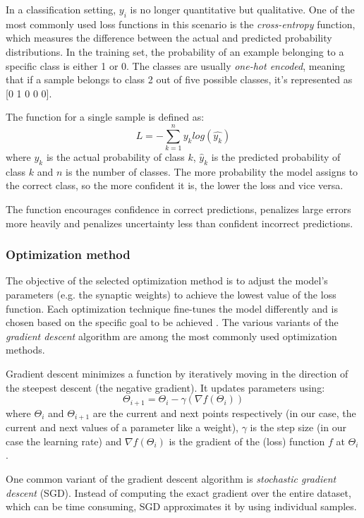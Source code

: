 \documentclass[a4paper,oneside,onecolumn,12pt]{book}
\begin{document}
		In a classification setting, $y_i$ is no longer quantitative but qualitative. One of the most commonly used loss functions in this scenario is the \textit{cross-entropy} function, which measures the difference between the actual and predicted probability distributions. In the training set, the probability of an example belonging to a specific class is either 1 or 0. The classes are usually \textit{one-hot encoded}, meaning that if a sample belongs to class 2 out of five possible classes, it's represented as [0 1 0 0 0].

		The function for a single sample is defined as:
		\[ L = -\sum_{k=1}^{n} y_k log(\hat{y_k}) \]
		where $y_k$ is the actual probability of class $k$, $\hat{y}_k$ is the predicted probability of class $k$ and $n$ is the number of classes. The more probability the model assigns to the correct class, so the more confident it is, the lower the loss and vice versa. \cite{AISL}

		The function encourages confidence in correct predictions, penalizes large errors more heavily and penalizes uncertainty less than confident incorrect predictions.\cite{BOCEL}

		\subsubsection{Optimization method}
		The objective of the selected optimization method is to adjust the model's parameters (e.g. the synaptic weights) to achieve the lowest value of the loss function. Each optimization technique fine-tunes the model differently and is chosen based on the specific goal to be achieved \cite{COOTMLT}. The various variants of the \textit{gradient descent} algorithm are among the most commonly used optimization methods.

		Gradient descent minimizes a function by iteratively moving in the direction of the steepest descent (the negative gradient). It updates parameters using:
		\[ \Theta_{i+1} = \Theta_{i} - \gamma(\nabla f(\Theta_i)) \]
		where $\Theta_{i}$ and $\Theta_{i+1}$ are the current and next points respectively (in our case, the current and next values of a parameter like a weight), $\gamma$ is the step size (in our case the learning rate) and $\nabla f(\Theta_i)$ is the gradient of the (loss) function $f$ at $\Theta_i$.

		One common variant of the gradient descent algorithm is \textit{stochastic gradient descent} (SGD). Instead of computing the exact gradient over the entire dataset, which can be time consuming, SGD approximates it by using individual samples. \cite{MML} 
\end{document}

